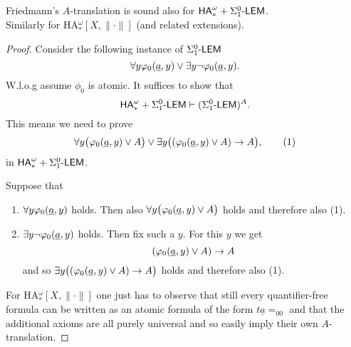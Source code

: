 \begin{lemma}\label{l:Atrans+}
Friedmann's $A$-translation is sound also for ${\textsf{\upshape HA}}^\omega_* + \Sigma^0_1\textsf{\upshape -LEM}$.\\ Similarly for 
{\rm HA$_*^{\omega}[X,\|\cdot\|]$} (and related extensions).
\end{lemma}
\begin{proof}
Consider the following instance of $\Sigma^0_1\textsf{\upshape -LEM}$
\[\forall y \varphi_0(\underline a,y)  \vee \exists y \neg\varphi_0(\underline a,y).\] 
W.l.o.g assume $\phi_0$ is atomic. 
It suffices to show that
\[{\textsf{\upshape HA}}^\omega_* + \Sigma^0_1\textsf{\upshape -LEM}\vdash (\Sigma^0_1\textsf{\upshape -LEM})^A.\]
This means we need to prove
\[ \forall y \big( \varphi_0(\underline a,y) \vee A\big) \vee \exists y \big(  (\varphi_0(\underline a,y) \vee A) \rightarrow A\big),\tag{1}\]
in ${\textsf{\upshape HA}}^\omega_* + \Sigma^0_1\textsf{\upshape -LEM}$.

Suppose that
\begin{enumerate}
\item $\forall y \varphi_0(\underline a,y)$ holds. Then also $\forall y \big( \varphi_0(\underline a,y) \vee A\big)$ holds and therefore also (1).
\item $\exists y \neg\varphi_0(\underline a,y)$ holds. Then fix such a $y$. For this $y$ we get 
\[(\varphi_0(\underline a,y) \vee A) \rightarrow A\]
and so $ \exists y \big(  (\varphi_0(\underline a,y) \vee A) \rightarrow A\big)$ holds and therefore also (1). 
\end{enumerate}
For HA$_*^{\omega}[X,\|\cdot\|]$ one just has to observe that still every 
quantifier-free formula can be written as an atomic formula of the form 
$t\underline{a}=_00$ and that the additional axioms are all purely universal 
and so easily imply their own $A$-translation.  
\end{proof}


